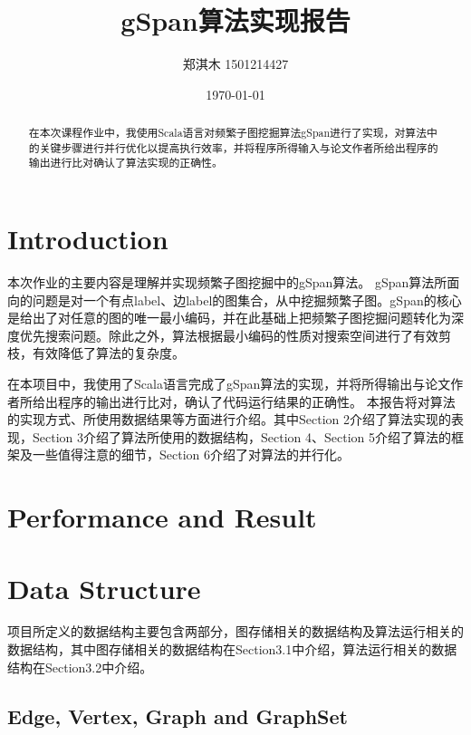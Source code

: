 \documentclass{article}
\title{gSpan算法实现报告}
\author{郑淇木  1501214427}
\date{\today}
\begin{document}
\maketitle

\begin{abstract}
在本次课程作业中，我使用Scala语言对频繁子图挖掘算法gSpan进行了实现，对算法中的关键步骤进行并行优化以提高执行效率，并将程序所得输入与论文作者所给出程序的输出进行比对确认了算法实现的正确性。

\end{abstract}

\section{Introduction}
本次作业的主要内容是理解并实现频繁子图挖掘中的gSpan算法\cite{gspan2002,gspanlong}。
gSpan算法所面向的问题是对一个有点label、边label的图集合，从中挖掘频繁子图。gSpan的核心是给出了对任意的图的唯一最小编码，并在此基础上把频繁子图挖掘问题转化为深度优先搜索问题。除此之外，算法根据最小编码的性质对搜索空间进行了有效剪枝，有效降低了算法的复杂度。

在本项目中，我使用了Scala语言完成了gSpan算法的实现，并将所得输出与论文作者所给出程序的输出进行比对，确认了代码运行结果的正确性。
本报告将对算法的实现方式、所使用数据结果等方面进行介绍。其中Section 2介绍了算法实现的表现，Section 3介绍了算法所使用的数据结构，Section 4、Section 5介绍了算法的框架及一些值得注意的细节，Section 6介绍了对算法的并行化。
\section{Performance and Result}



\section{Data Structure}

项目所定义的数据结构主要包含两部分，图存储相关的数据结构及算法运行相关的数据结构，其中图存储相关的数据结构在Section3.1中介绍，算法运行相关的数据结构在Section3.2中介绍。

\subsection{Edge, Vertex, Graph and GraphSet}
\end{document}
